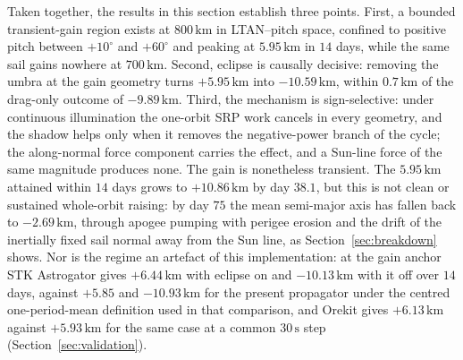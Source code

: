 \vspace{5pt}
\par\noindent Taken together, the results in this section establish three points. First, a bounded transient-gain region exists at \(800\,\mathrm{km}\) in LTAN--pitch space, confined to positive pitch between \(+10^\circ\) and \(+60^\circ\) and peaking at \(5.95\,\mathrm{km}\) in \(14\) days, while the same sail gains nowhere at \(700\,\mathrm{km}\). Second, eclipse is causally decisive: removing the umbra at the gain geometry turns \(+5.95\,\mathrm{km}\) into \(-10.59\,\mathrm{km}\), within \(0.7\,\mathrm{km}\) of the drag-only outcome of \(-9.89\,\mathrm{km}\). Third, the mechanism is sign-selective: under continuous illumination the one-orbit SRP work cancels in every geometry, and the shadow helps only when it removes the negative-power branch of the cycle; the along-normal force component carries the effect, and a Sun-line force of the same magnitude produces none. The gain is nonetheless transient. The \(5.95\,\mathrm{km}\) attained within \(14\) days grows to \(+10.86\,\mathrm{km}\) by day \(38.1\), but this is not clean or sustained whole-orbit raising: by day \(75\) the mean semi-major axis has fallen back to \(-2.69\,\mathrm{km}\), through apogee pumping with perigee erosion and the drift of the inertially fixed sail normal away from the Sun line, as Section~\ref{sec:breakdown} shows. Nor is the regime an artefact of this implementation: at the gain anchor STK Astrogator gives \(+6.44\,\mathrm{km}\) with eclipse on and \(-10.13\,\mathrm{km}\) with it off over \(14\) days, against \(+5.85\) and \(-10.93\,\mathrm{km}\) for the present propagator under the centred one-period-mean definition used in that comparison, and Orekit gives \(+6.13\,\mathrm{km}\) against \(+5.93\,\mathrm{km}\) for the same case at a common \(30\,\mathrm{s}\) step (Section~\ref{sec:validation}).

\FloatBarrier
